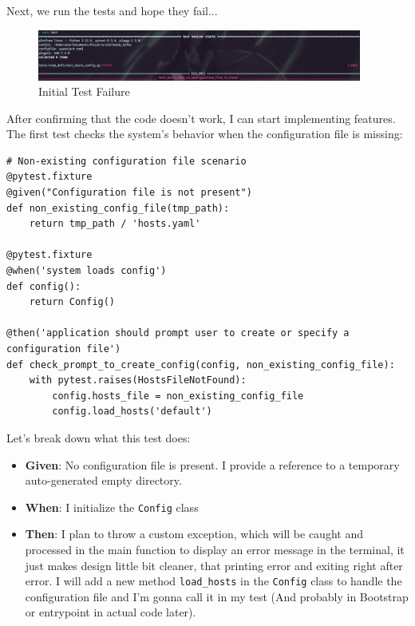 \documentclass[10pt , a4paper]{report}
\newenvironment{code}{\captionsetup{type=listing}}{}
\begin{document}
Next, we run the tests and hope they fail...

\begin{figure}[htbp]
  \begin{center}
    \includegraphics[width=0.95\textwidth]{imgs/FirstTestFailed.png}
  \end{center}
  \caption{Initial Test Failure}
\end{figure}

After confirming that the code doesn't work, I can start implementing features. The first test checks the system's behavior when the configuration file is missing:

\begin{code}
  \begin{verbatim}
# Non-existing configuration file scenario
@pytest.fixture
@given("Configuration file is not present")
def non_existing_config_file(tmp_path):
    return tmp_path / 'hosts.yaml'

@pytest.fixture
@when('system loads config')
def config():
    return Config()

@then('application should prompt user to create or specify a configuration file')
def check_prompt_to_create_config(config, non_existing_config_file):
    with pytest.raises(HostsFileNotFound):
        config.hosts_file = non_existing_config_file
        config.load_hosts('default')
  \end{verbatim}
\end{code}

Let’s break down what this test does:

\begin{itemize}
  \item \textbf{Given}: No configuration file is present. I provide a reference to a temporary auto-generated empty directory.
  \item \textbf{When}: I initialize the \texttt{Config} class
  \item \textbf{Then}: I plan to throw a custom exception, which will be caught and processed in the main function to display an error message in the terminal, it just makes design little bit cleaner, that printing error and exiting right after error. I will add a new method \texttt{load\_hosts} in the \texttt{Config} class to handle the configuration file and I'm gonna call it in my test (And probably in Bootstrap or entrypoint in actual code later).
\end{itemize}
\end{document}
